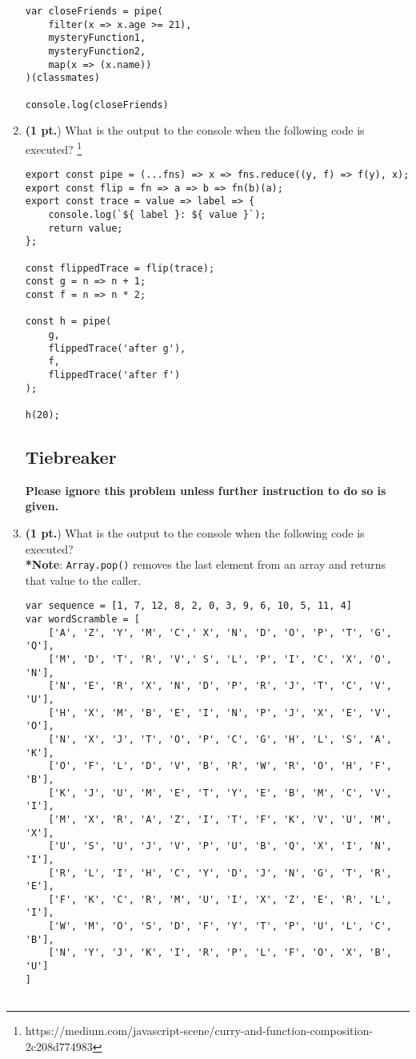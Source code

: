 \documentclass[12pt]{article}
\begin{document}
\begin{enumerate}
\begin{lstlisting}[style=JavaScript]
var closeFriends = pipe(
    filter(x => x.age >= 21),
    mysteryFunction1,
    mysteryFunction2,
    map(x => (x.name))
)(classmates)

console.log(closeFriends)
\end{lstlisting}


\newpage
\item \textbf{(1 pt.}) What is the output to the console when the following code is executed? \footnote{\label{note2}https://medium.com/javascript-scene/curry-and-function-composition-2c208d774983}
    
\begin{lstlisting}[style=JavaScript]
export const pipe = (...fns) => x => fns.reduce((y, f) => f(y), x);
export const flip = fn => a => b => fn(b)(a);
export const trace = value => label => {
    console.log(`${ label }: ${ value }`);
    return value;
};

const flippedTrace = flip(trace);
const g = n => n + 1;
const f = n => n * 2;

const h = pipe(
    g,                
    flippedTrace('after g'),
    f,
    flippedTrace('after f')
);

h(20);
\end{lstlisting}

    
    
\newpage
\subsection{Tiebreaker}
\textbf{Please ignore this problem unless further instruction to do so is given.}

\item \textbf{(1 pt.}) What is the output to the console when the following code is executed? \\ \textbf{*Note}: \texttt{Array.pop()} removes the last element from an array and returns that value to the caller.\footnotemark[\ref{note1}] 


    
\begin{lstlisting}[style=JavaScript]
var sequence = [1, 7, 12, 8, 2, 0, 3, 9, 6, 10, 5, 11, 4]
var wordScramble = [
    ['A', 'Z', 'Y', 'M', 'C',' X', 'N', 'D', 'O', 'P', 'T', 'G', 'Q'],
    ['M', 'D', 'T', 'R', 'V',' S', 'L', 'P', 'I', 'C', 'X', 'O', 'N'],
    ['N', 'E', 'R', 'X', 'N', 'D', 'P', 'R', 'J', 'T', 'C', 'V', 'U'],
    ['H', 'X', 'M', 'B', 'E', 'I', 'N', 'P', 'J', 'X', 'E', 'V', 'O'],
    ['N', 'X', 'J', 'T', 'O', 'P', 'C', 'G', 'H', 'L', 'S', 'A', 'K'],
    ['O', 'F', 'L', 'D', 'V', 'B', 'R', 'W', 'R', 'O', 'H', 'F', 'B'],
    ['K', 'J', 'U', 'M', 'E', 'T', 'Y', 'E', 'B', 'M', 'C', 'V', 'I'],
    ['M', 'X', 'R', 'A', 'Z', 'I', 'T', 'F', 'K', 'V', 'U', 'M', 'X'],
    ['U', 'S', 'U', 'J', 'V', 'P', 'U', 'B', 'Q', 'X', 'I', 'N', 'I'],
    ['R', 'L', 'I', 'H', 'C', 'Y', 'D', 'J', 'N', 'G', 'T', 'R', 'E'],
    ['F', 'K', 'C', 'R', 'M', 'U', 'I', 'X', 'Z', 'E', 'R', 'L', 'I'],
    ['W', 'M', 'O', 'S', 'D', 'F', 'Y', 'T', 'P', 'U', 'L', 'C', 'B'],
    ['N', 'Y', 'J', 'K', 'I', 'R', 'P', 'L', 'F', 'O', 'X', 'B', 'U']
]


\end{lstlisting}
\end{enumerate}
\end{document}
